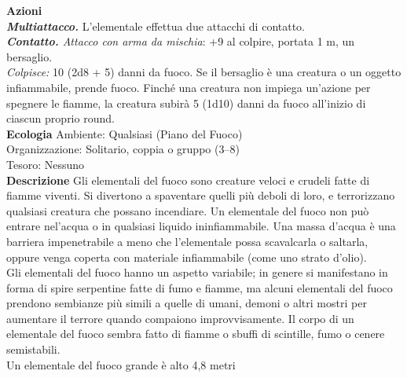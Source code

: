 \begin{multicols}{2}
\smallskip\textbf{Azioni}\\
\emph{\textbf{Multiattacco.}} L'elementale effettua due attacchi di contatto.\\
\emph{\textbf{Contatto.} Attacco con arma da mischia}: +9 al colpire, portata 1 m, un bersaglio.\\
\emph{Colpisce:} 10 (2d8 + 5) danni da fuoco. Se il bersaglio è una creatura o un oggetto infiammabile, prende fuoco. Finché una creatura non impiega un'azione per spegnere le fiamme, la creatura subirà 5 (1d10) danni da fuoco all'inizio di ciascun proprio round.\\
\textbf{Ecologia}
Ambiente: Qualsiasi (Piano del Fuoco)\\
Organizzazione: Solitario, coppia o gruppo (3–8)\\
Tesoro: Nessuno\\
\textbf{Descrizione}
Gli elementali del fuoco sono creature veloci e crudeli fatte di fiamme viventi. Si divertono a spaventare quelli più deboli di loro, e terrorizzano qualsiasi creatura che possano incendiare. Un elementale del fuoco non può entrare nel'acqua o in qualsiasi liquido ininfiammabile. Una massa d’acqua è una barriera impenetrabile a meno che l'elementale possa scavalcarla o saltarla, oppure venga coperta con materiale infiammabile (come uno strato d’olio).\\
Gli elementali del fuoco hanno un aspetto variabile; in genere si manifestano in forma di spire serpentine fatte di fumo e fiamme, ma alcuni elementali del fuoco prendono sembianze più simili a quelle di umani, demoni o altri mostri per aumentare il terrore quando compaiono improvvisamente. Il corpo di un elementale del fuoco sembra fatto di fiamme o sbuffi di scintille, fumo o cenere semistabili.\\

Un elementale del fuoco grande è alto 4,8 metri\\



\end{multicols}
